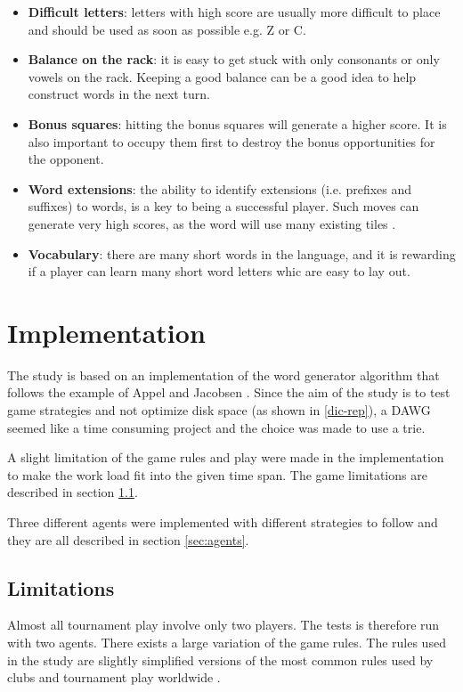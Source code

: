 \documentclass[a4paper, 12pt]{report}
\begin{document}
\begin{itemize}
\item {\bf Difficult letters}: letters with high score are usually more difficult to place and should be used as soon as possible e.g. Z or C.
\item {\bf Balance on the rack}: it is easy to get stuck with only consonants or only vowels on the rack. Keeping a good balance can be a good idea to help construct words in the next turn.
\item {\bf Bonus squares}: hitting the bonus squares will generate a higher score. It is also important to occupy them first to destroy the bonus opportunities for the opponent.
\item {\bf Word extensions}: the ability to identify extensions (i.e. prefixes and suffixes) to words, is a key to being a successful player. Such moves can generate very high scores, as the word will use many existing tiles \cite{perfectgame}.
\item {\bf Vocabulary}: there are many short words in the language, and it is rewarding if a player can learn many short word letters whic are easy to lay out.
\end{itemize}





\chapter{Implementation}
The study is based on an implementation of the word generator algorithm that follows the example of Appel and Jacobsen \cite{fastest}. Since the aim of the study is to test game strategies and not optimize disk space (as shown in \ref{dic-rep}), a DAWG seemed like a time consuming project and the choice was made to use a trie.

A slight limitation of the game rules and play were made in the implementation to make the work load fit into the given time span. The game limitations are described in section \ref{sec:limitations}.

Three different agents were implemented with different strategies to follow and they are all described in section \ref{sec:agents}.

\section{Limitations}
\label{sec:limitations}
Almost all tournament play involve only two players. The tests is therefore run with two agents. There exists a large variation of the game rules. The rules used in the study are slightly simplified versions of the most common rules used by clubs and tournament play worldwide \cite{forbund} \cite{ABSP} \cite{NASPA}.
\end{document}
